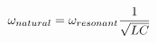 \documentclass[preview]{standalone}
\begin{document}
\begin{align*}
\omega _{natural} = \omega_{resonant} {1 \over \sqrt{ L C}}
\end{align*}
\end{document}
